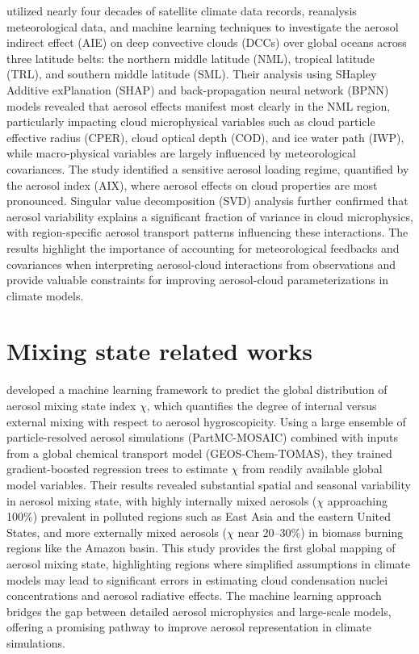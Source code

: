 \documentclass[11pt]{article}
\begin{document}
\citet{zhao2024studying} utilized nearly four decades of satellite climate data records, reanalysis meteorological data, and machine learning techniques to investigate the aerosol indirect effect (AIE) on deep convective clouds (DCCs) over global oceans across three latitude belts: the northern middle latitude (NML), tropical latitude (TRL), and southern middle latitude (SML). Their analysis using SHapley Additive exPlanation (SHAP) and back-propagation neural network (BPNN) models revealed that aerosol effects manifest most clearly in the NML region, particularly impacting cloud microphysical variables such as cloud particle effective radius (CPER), cloud optical depth (COD), and ice water path (IWP), while macro-physical variables are largely influenced by meteorological covariances. The study identified a sensitive aerosol loading regime, quantified by the aerosol index (AIX), where aerosol effects on cloud properties are most pronounced. Singular value decomposition (SVD) analysis further confirmed that aerosol variability explains a significant fraction of variance in cloud microphysics, with region-specific aerosol transport patterns influencing these interactions. The results highlight the importance of accounting for meteorological feedbacks and covariances when interpreting aerosol-cloud interactions from observations and provide valuable constraints for improving aerosol-cloud parameterizations in climate models.

\section{Mixing state related works}
\citet{hughes2018machine} developed a machine learning framework to predict the global distribution of aerosol mixing state index \(\chi\), which quantifies the degree of internal versus external mixing with respect to aerosol hygroscopicity. Using a large ensemble of particle-resolved aerosol simulations (PartMC-MOSAIC) combined with inputs from a global chemical transport model (GEOS-Chem-TOMAS), they trained gradient-boosted regression trees to estimate \(\chi\) from readily available global model variables. Their results revealed substantial spatial and seasonal variability in aerosol mixing state, with highly internally mixed aerosols (\(\chi\) approaching 100\%) prevalent in polluted regions such as East Asia and the eastern United States, and more externally mixed aerosols (\(\chi\) near 20–30\%) in biomass burning regions like the Amazon basin. This study provides the first global mapping of aerosol mixing state, highlighting regions where simplified assumptions in climate models may lead to significant errors in estimating cloud condensation nuclei concentrations and aerosol radiative effects. The machine learning approach bridges the gap between detailed aerosol microphysics and large-scale models, offering a promising pathway to improve aerosol representation in climate simulations.
\end{document}
